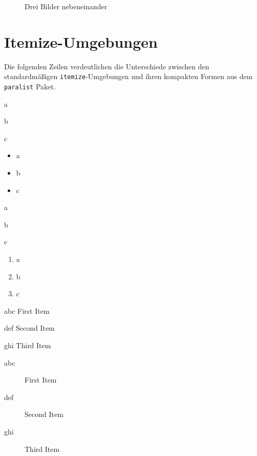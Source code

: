 \begin{figure}[b]
  \centering
  \subfloat[Bild 1]{\rule{5cm}{3cm}\quad}             
  \subfloat[Bild 2]{\rule{5cm}{3cm}\quad} 
  \subfloat[Bild 3]{\rule{5cm}{3cm}}
  \caption{Drei Bilder nebeneinander}
  \label{fig:subfig}
\end{figure}

\section{Itemize-Umgebungen}\label{sec:itemize}

Die folgenden Zeilen verdeutlichen die Unterschiede zwischen den standardmäßigen \texttt{itemize}-Umgebungen und ihren kompakten Formen aus dem \texttt{paralist} Paket.

\begin{compactitem}
\item a
\item b
\item c
\end{compactitem}

\begin{itemize}
\item a
\item b
\item c
\end{itemize}

\begin{compactenum}
\item a
\item b
\item c
\end{compactenum}

\begin{enumerate}
\item a
\item b
\item c
\end{enumerate}

\begin{compactdesc}
\item[abc] First Item
\item[def] Second Item
\item[ghi] Third Item
\end{compactdesc}


\begin{description}
\item[abc] First Item
\item[def] Second Item
\item[ghi] Third Item
\end{description}

